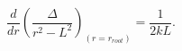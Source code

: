 \begin{equation}
\frac{d}{dr}\left(\frac{{\Delta}}{r^{2}-L^{2}}
\right)_{(r=r_{root})}=\frac{1}{2kL}. \label{dercond}
\end{equation}

